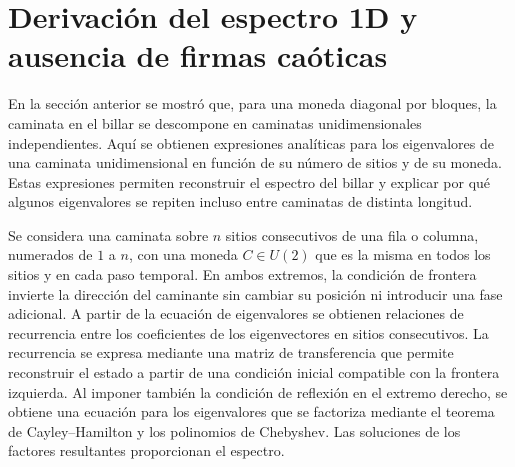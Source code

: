 \documentclass[12pt,a4paper,oneside]{report} %
\begin{document}
\section{Derivación del espectro 1D y ausencia de firmas caóticas} %


En la sección anterior se mostró que, para una moneda diagonal por bloques, la caminata en el billar se descompone en caminatas unidimensionales independientes. Aquí se obtienen expresiones analíticas para los eigenvalores de una caminata unidimensional en función de su número de sitios y de su moneda. Estas expresiones permiten reconstruir el espectro del billar y explicar por qué algunos eigenvalores se repiten incluso entre caminatas de distinta longitud.

Se considera una caminata sobre $n$ sitios consecutivos de una fila o columna, numerados de $1$ a $n$, con una moneda $C\in U(2)$ que es la misma en todos los sitios y en cada paso temporal. En ambos extremos, la condición de frontera invierte la dirección del caminante sin cambiar su posición ni introducir una fase adicional. A partir de la ecuación de eigenvalores se obtienen relaciones de recurrencia entre los coeficientes de los eigenvectores en sitios consecutivos. La recurrencia se expresa mediante una matriz de transferencia que permite reconstruir el estado a partir de una condición inicial compatible con la frontera izquierda. Al imponer también la condición de reflexión en el extremo derecho, se obtiene una ecuación para los eigenvalores que se factoriza mediante el teorema de Cayley--Hamilton y los polinomios de Chebyshev. Las soluciones de los factores resultantes proporcionan el espectro.
\end{document}
